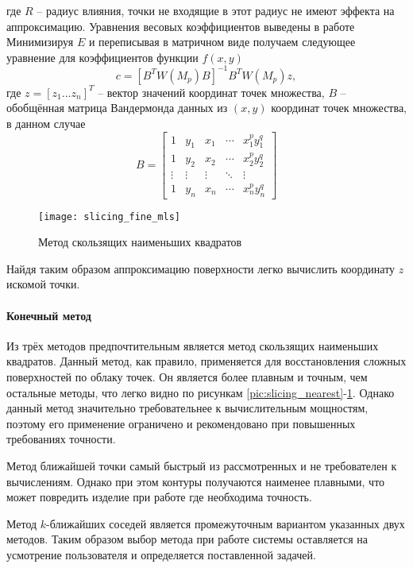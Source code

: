          где $ R $ -- радиус влияния, точки не входящие в этот радиус не имеют эффекта на аппроксимацию.
         Уравнения весовых коэффициентов выведены в работе \cite{LI2008}
         Минимизируя $ E $ и переписывая в матричном виде получаем следующее уравнение для коэффициентов функции $ f(x,y) $
         \begin{equation}
             c = \left[B^T W(M_p) B\right]^{-1} B^T W(M_p) z,
         \end{equation}
         где $ z = [z_1 ... z_n]^T$ -- вектор значений координат точек множества, $ B $ -- обобщённая матрица Вандермонда данных из $ (x,y) $ координат точек множества, в данном случае
         \begin{equation}
             B = 
             \begin{bmatrix}
                 1 & y_1 & x_1 & \cdots & x_1^p y_1^q\\
                 1 & y_2 & x_2 & \cdots & x_2^p y_2^q\\
                 \vdots & \vdots & \vdots & \ddots & \vdots\\
                 1 & y_n & x_n & \cdots & x_n^p y_n^q
             \end{bmatrix}
         \end{equation}
         
         \begin{figure}[H]
             \centering
             \texttt{[image: slicing\_fine\_mls]}
             \caption{Метод скользящих наименьших квадратов}
             \label{pic:slicing_mls}
         \end{figure}
         
         Найдя таким образом аппроксимацию поверхности легко вычислить координату $ z $ искомой точки.
        
        \paragraph{Конечный метод}
            Из трёх методов предпочтительным является метод скользящих наименьших квадратов. Данный метод, как правило, применяется для восстановления сложных поверхностей по облаку точек. Он является более плавным и точным, чем остальные методы, что легко видно по рисункам \ref{pic:slicing_nearest}-\ref{pic:slicing_mls}. Однако данный метод значительно требовательнее к вычислительным мощностям, поэтому его применение ограничено и рекомендовано при повышенных требованиях точности. 
            
            Метод ближайшей точки самый быстрый из рассмотренных и не требователен к вычислениям. Однако при этом контуры получаются наименее плавными, что может повредить изделие при работе где необходима точность.
            
            Метод $ k $-ближайших соседей является промежуточным вариантом указанных двух методов. Таким образом выбор метода при работе системы оставляется на усмотрение пользователя и определяется поставленной задачей.
        
        
        
        
        
        
        